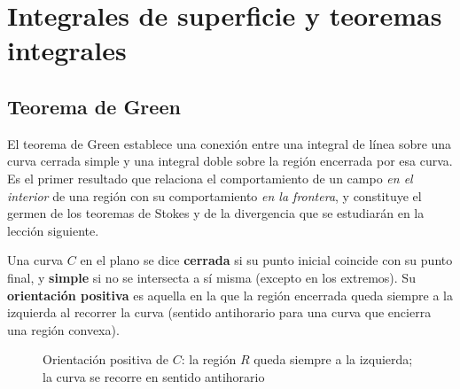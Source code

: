 
\chapter{Integrales de superficie y teoremas integrales}
\section{Teorema de Green}

El teorema de Green establece una conexión entre una integral de línea
sobre una curva cerrada simple y una integral doble sobre la región
encerrada por esa curva. Es el primer resultado que relaciona el
comportamiento de un campo \emph{en el interior} de una región con su
comportamiento \emph{en la frontera}, y constituye el germen de los
teoremas de Stokes y de la divergencia que se estudiarán en la lección
siguiente.

\begin{definition}
Una curva $C$ en el plano se dice \textbf{cerrada} si su punto inicial
coincide con su punto final, y \textbf{simple} si no se intersecta a sí
misma (excepto en los extremos). Su \textbf{orientación positiva} es
aquella en la que la región encerrada queda siempre a la izquierda al
recorrer la curva (sentido antihorario para una curva que encierra una
región convexa).
\end{definition}

\begin{figure}[!htbp]
\centering
{}
\caption{Orientación positiva de $C$: la región $R$ queda siempre a la
         izquierda; la curva se recorre en sentido antihorario}
\label{fig:curva_orientacion_positiva}
\end{figure}

